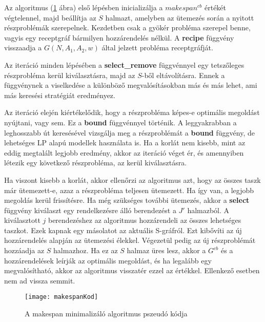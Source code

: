 Az algoritmus (\ref{makespanKod} ábra) első lépésben inicializálja a $makespan^{cb}$ értékét végtelennel, majd beállítja az $S$ halmazt, amelyben az ütemezés során a nyitott részproblémák szerepelnek. Kezdetben csak a gyökér probléma szerepel benne, vagyis egy receptgráf bármilyen hozzárendelés nélkül. A \textbf{recipe} függvény visszaadja a $G(N,A_1,A_2,w)$ által jelzett probléma receptgráfját.

Az iteráció minden lépésében a \textbf{select\_remove} függvénnyel egy tetszőleges részprobléma kerül kiválasztásra, majd az $S$-ből eltávolításra. Ennek a függvénynek a viselkedése a különböző megvalósításokban más és más lehet, ami más keresési stratégiát eredményez.

Az iteráció elején kiértékelődik, hogy a részprobléma képes-e optimális megoldást nyújtani, vagy sem. Ez a \textbf{bound} függvénnyel történik. A leggyakrabban a leghosszabb út keresésével vizsgálja meg a részproblémát a \textbf{bound} függvény, de lehetséges LP alapú modellek használata is. Ha a korlát nem kisebb, mint az eddig megtalált legjobb eredmény, akkor az iteráció véget ér, és amennyiben létezik egy következő részprobléma, az kerül kiválasztásra. 

Ha viszont kisebb a korlát, akkor ellenőrzi az algoritmus azt, hogy az összes taszk már ütemezett-e, azaz a részprobléma teljesen ütemezett. Ha így van, a legjobb megoldás kerül frissítésre. Ha még szükséges további ütemezés, akkor a  \textbf{select} függvény kiválaszt egy rendelkezésre álló berendezést a $J'$ halmazból. A kiválasztott $j$ berendezéshez az algoritmus hozzárendeli az összes lehetséges taszkot. Ezek kapnak egy másolatot az aktuális S-gráfról. Ezt kibővíti az új hozzárendelés alapján az ütemezési élekkel. Végezetül pedig az új részproblémát hozzáadja az $S$ halmazhoz. Ha ez az $S$ halmaz üres lesz, akkor a $G^{cb}$ és a hozzárendelések leírják az optimális megoldást, és ha legalább egy megvalósítható, akkor az algoritmus visszatér ezzel az értékkel. Ellenkező esetben nem ad vissza semmit.

\begin{figure}[H]
\begin{center}
\texttt{[image: makespanKod]}
\caption{A makespan minimalizáló algoritmus pszeudó kódja\cite{Hegyhati}}
\label{makespanKod}
\end{center}
\end{figure}

